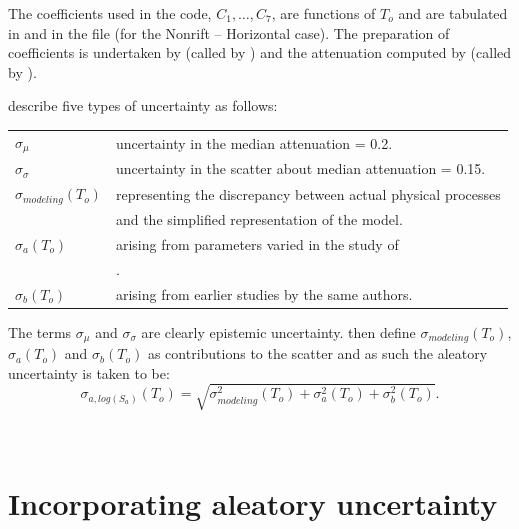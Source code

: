 The coefficients used in the code, $C_1,\ldots,C_7$, are functions
of $T_o$ and are tabulated in \citet[Table 9]{dr_Somerville01a}
and in the file 
(for the Nonrift -- Horizontal case). The preparation of
coefficients is undertaken by
 (called by
) and the attenuation computed by
 (called by
).

\cite{dr_Somerville01a} describe five types of uncertainty as
follows:

\begin{supertabular}{ll}
$\sigma_{\mu}$ & uncertainty in the median attenuation = 0.2. \\
$\sigma_{\sigma}$ & uncertainty in the scatter about median attenuation = 0.15. \\
$\sigma_{modeling}(T_o)$ & representing the discrepancy between
actual
physical processes \\
  & and the simplified representation of the model.\\
$\sigma_a(T_o)$ & arising from parameters varied in the study of \\
 & \cite{dr_Somerville01a}. \\
$\sigma_b(T_o)$ & arising from earlier studies by the same
authors.\\
\end{supertabular}

The terms $\sigma_{\mu}$ and $\sigma_{\sigma}$ are clearly
epistemic uncertainty. \cite{dr_Somerville01a} then define
$\sigma_{modeling}(T_o)$, $\sigma_a(T_o)$ and $\sigma_b(T_o)$ as
contributions to the scatter and as such the aleatory uncertainty
is taken to be:
\begin{equation}
\sigma_{a,log(S_a)}(T_o) = \sqrt{
\sigma_{modeling}^2(T_o)+\sigma_a^2(T_o)+\sigma_b^2(T_o) }.
\end{equation}

\

\section{Incorporating aleatory uncertainty}
\label{attn:uncertainty}

